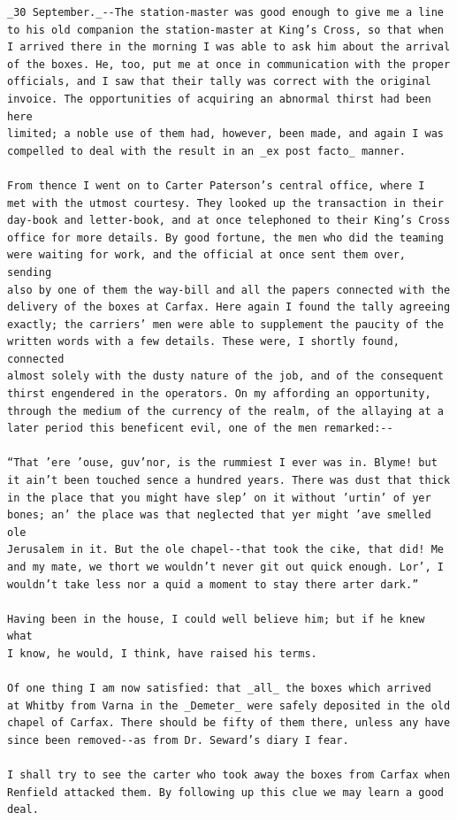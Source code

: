 \documentclass{article}
\begin{document}
\begin{verbatim}
_30 September._--The station-master was good enough to give me a line
to his old companion the station-master at King’s Cross, so that when
I arrived there in the morning I was able to ask him about the arrival
of the boxes. He, too, put me at once in communication with the proper
officials, and I saw that their tally was correct with the original
invoice. The opportunities of acquiring an abnormal thirst had been here
limited; a noble use of them had, however, been made, and again I was
compelled to deal with the result in an _ex post facto_ manner.

From thence I went on to Carter Paterson’s central office, where I
met with the utmost courtesy. They looked up the transaction in their
day-book and letter-book, and at once telephoned to their King’s Cross
office for more details. By good fortune, the men who did the teaming
were waiting for work, and the official at once sent them over, sending
also by one of them the way-bill and all the papers connected with the
delivery of the boxes at Carfax. Here again I found the tally agreeing
exactly; the carriers’ men were able to supplement the paucity of the
written words with a few details. These were, I shortly found, connected
almost solely with the dusty nature of the job, and of the consequent
thirst engendered in the operators. On my affording an opportunity,
through the medium of the currency of the realm, of the allaying at a
later period this beneficent evil, one of the men remarked:--

“That ’ere ’ouse, guv’nor, is the rummiest I ever was in. Blyme! but
it ain’t been touched sence a hundred years. There was dust that thick
in the place that you might have slep’ on it without ’urtin’ of yer
bones; an’ the place was that neglected that yer might ’ave smelled ole
Jerusalem in it. But the ole chapel--that took the cike, that did! Me
and my mate, we thort we wouldn’t never git out quick enough. Lor’, I
wouldn’t take less nor a quid a moment to stay there arter dark.”

Having been in the house, I could well believe him; but if he knew what
I know, he would, I think, have raised his terms.

Of one thing I am now satisfied: that _all_ the boxes which arrived
at Whitby from Varna in the _Demeter_ were safely deposited in the old
chapel of Carfax. There should be fifty of them there, unless any have
since been removed--as from Dr. Seward’s diary I fear.

I shall try to see the carter who took away the boxes from Carfax when
Renfield attacked them. By following up this clue we may learn a good
deal.


\end{verbatim}
\end{document}
